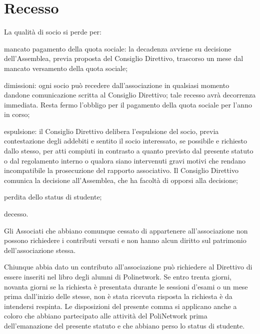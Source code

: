 \documentclass[legalpaper, 11pt]{exam}
\let\tempone\enumerate
\let\temptwo\endenumerate
\renewenvironment{enumerate}{\tempone\addtolength{\itemsep}{-0.45\baselineskip}}{\temptwo}
\begin{document}
\section{Recesso}
\begin{enumerate}
 \item La qualità di socio si perde per:
 \vspace{-5pt}
 \begin{enumerate}
  \item mancato pagamento della quota sociale: la decadenza avviene su decisione dell’Assemblea, previa proposta del Consiglio Direttivo, trascorso un mese dal mancato versamento della quota sociale;
  \item dimissioni: ogni socio può recedere dall’associazione in qualsiasi momento dandone comunicazione scritta al Consiglio Direttivo; tale recesso avrà decorrenza immediata. Resta fermo l’obbligo per il pagamento della quota sociale per l’anno in corso;
  \item espulsione: il Consiglio Direttivo delibera l’espulsione del socio, previa contestazione degli addebiti e sentito il socio interessato, se possibile e richiesto dallo stesso, per atti compiuti in contrasto a quanto previsto dal presente statuto o dal regolamento interno o qualora siano intervenuti gravi motivi che rendano incompatibile la prosecuzione del rapporto associativo. Il Consiglio Direttivo comunica la decisione all’Assemblea, che ha facoltà di opporsi alla decisione;
  \item perdita dello status di studente;
  \item decesso.
 \end{enumerate}

 \item Gli Associati che abbiano comunque cessato di appartenere all’associazione non possono richiedere i contributi versati e non hanno alcun diritto sul patrimonio dell’associazione stessa.
 \item Chiunque abbia dato un contributo all’associazione può richiedere al Direttivo di essere inseriti nel libro degli alumni di Polinetwork. Se entro trenta giorni, novanta giorni se la richiesta è presentata durante le sessioni d’esami o un mese prima dall’inizio delle stesse, non è stata ricevuta risposta la richiesta è da intendersi respinta.
 Le disposizioni del presente comma si applicano anche a coloro che abbiano partecipato alle attività del PoliNetwork prima dell’emanazione del presente statuto e che abbiano perso lo status di studente.
\end{enumerate}
\end{document}
